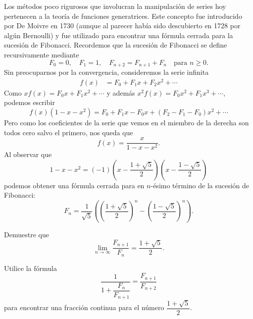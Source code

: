 Los métodos poco rigurosos que involucran la manipulación de series hoy pertenecen a la teoría de funciones generatrices. Este concepto 
fue introducido por De Moivre en 1730 (aunque al parecer había sido descubierto
en 1728 por algún Bernoulli)
y fue utilizado para encontrar una fórmula cerrada para la sucesión de Fibonacci. Recordemos que la sucesión de Fibonacci
se define recursivamente mediante 
\[
	F_0=0,\quad
	F_1=1,\quad
	F_{n+2}=F_{n+1}+F_n\quad\text{para $n\geq 0$}.
\]
Sin preocuparnos por la convergencia, 
consideremos la serie infinita
\begin{align*}
	f(x)&=F_0+F_1x+F_2x^2+\cdots
\end{align*}
Como $xf(x)=F_0x+F_1x^2+\cdots$ y además $x^2f(x)=F_0x^2+F_1x^3+\cdots$, podemos escribir
\[
	f(x)(1-x-x^2)=F_0+F_1x-F_0x+(F_2-F_1-F_0)x^2+\cdots
\]
Pero como los coeficientes de la serie que vemos en el miembro de la derecha son todos cero salvo el primero, nos queda
que
\[
	f(x)=\frac{x}{1-x-x^2}.
\]
Al observar que
\[
	1-x-x^2=(-1)\left(x-\frac{1+\sqrt{5}}{2}\right)\left(x-\frac{1-\sqrt{5}}{2}\right)
\]
podemos obtener una fórmula cerrada para en $n$-ésimo término de la sucesión de Fibonacci:
\[
	F_n=\frac{1}{\sqrt{5}}\left( \left(\frac{1+\sqrt{5}}{2}\right)^n-\left(\frac{1-\sqrt{5}}{2}\right)^n\right).
\]

\begin{exercise}
	Demuestre que 
	\[
		\lim_{n\to\infty}\frac{F_{n+1}}{F_n}=\frac{1+\sqrt{5}}{2}.
	\]
\end{exercise}

\begin{exercise}
	Utilice la fórmula
	\[
		\dfrac{1}{1+\dfrac{F_n}{F_{n+1}}}=\dfrac{F_{n+1}}{F_{n+2}}
	\]
	para encontrar una fracción continua para el número $\dfrac{1+\sqrt{5}}{2}$. 
\end{exercise}


